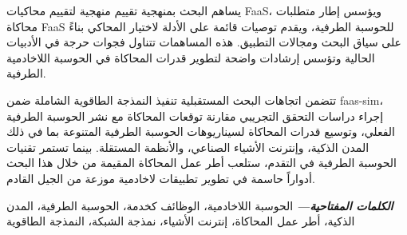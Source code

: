 يساهم البحث بمنهجية تقييم منهجية لتقييم محاكيات FaaS، ويؤسس إطار متطلبات محاكاة FaaS للحوسبة الطرفية، ويقدم توصيات قائمة على الأدلة لاختيار المحاكي بناءً على سياق البحث ومجالات التطبيق. هذه المساهمات تتناول فجوات حرجة في الأدبيات الحالية وتؤسس إرشادات واضحة لتطوير قدرات المحاكاة في الحوسبة اللاخادمية الطرفية.

تتضمن اتجاهات البحث المستقبلية تنفيذ النمذجة الطاقوية الشاملة ضمن faas-sim، إجراء دراسات التحقق التجريبي مقارنة توقعات المحاكاة مع نشر الحوسبة الطرفية الفعلي، وتوسيع قدرات المحاكاة لسيناريوهات الحوسبة الطرفية المتنوعة بما في ذلك المدن الذكية، وإنترنت الأشياء الصناعي، والأنظمة المستقلة. بينما تستمر تقنيات الحوسبة الطرفية في التقدم، ستلعب أطر عمل المحاكاة المقيمة من خلال هذا البحث أدواراً حاسمة في تطوير تطبيقات لاخادمية موزعة من الجيل القادم.

\providecommand{\keywordsar}[1] {
  \small
  \textbf{\textit{الكلمات المفتاحية---}} #1
}
\keywordsar{الحوسبة اللاخادمية، الوظائف كخدمة، الحوسبة الطرفية، المدن الذكية، أطر عمل المحاكاة، إنترنت الأشياء، نمذجة الشبكة، النمذجة الطاقوية}
